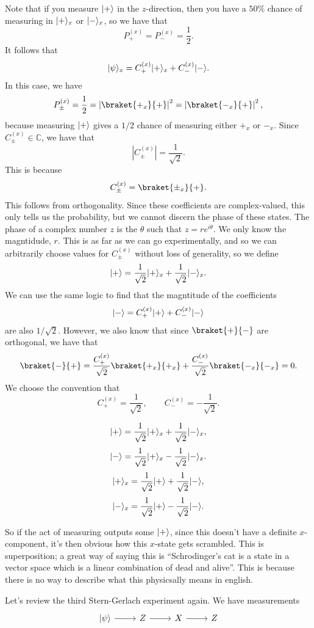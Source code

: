 Note that if you measure $\lvert+\rangle$ in the $z$-direction, then you have a $50\%$ chance of measuring in $\lvert+\rangle_x$ or $\lvert-\rangle_x$, so we have that
\[
	P_+^{(x)} =P_-^{(x)} =\frac{1}{2} 
.\]
It follows that
\[
	\lvert\psi\rangle_x = C_+^{(x)} \lvert+\rangle_x+C_-^{(x)} \lvert-\rangle
.\]
In this case, we have
\[
	P_{\pm}^{(x)} =\frac{1}{2} =\left| \braket{+_x}{+} \right| ^2 = \left| \braket{-_x}{+} \right|^2
,\]
because measuring $\lvert+\rangle$ gives a $1/2$ chance of measuring either $+_x$ or $-_x$. Since $C_\pm^{(x)} \in\mathbb{C} $, we have that
\[
	\left| C_\pm^{(x)}  \right| =\frac{1}{\sqrt{2} } 
.\]
This is because
\[
	C_{\pm} ^{(x)} =\braket{\pm_x}{+}
.\]
This follows from orthogonality. Since these coefficients are complex-valued, this only tells us the probability, but we cannot discern the phase of these states. The phase of a complex number $z$ is the $\theta $ such that $z=re^{i\theta } $. We only know the magntidude, $r$. This is as far as we can go experimentally, and so we can arbitrarily choose values for $C^{(x)} _{\pm} $ without loss of generality, so we define
\[
	\lvert+\rangle= \frac{1}{\sqrt{2} } \lvert+\rangle_x + \frac{1}{\sqrt{2} } \lvert-\rangle_x 
.\]
We can use the same logic to find that the magntitude of the coefficients
\[
	\lvert-\rangle = C_+^{(x)} \lvert+\rangle+C_-^{(x)} \lvert-\rangle
\]
are also $1/\sqrt{2} $. However, we also know that since $\braket{+}{-}$ are orthogonal, we have that
\[
	\braket{-}{+}=\frac{C_+^{(x)} }{\sqrt{2} } \braket{+_x}{+_x}+\frac{C_-^{(x)} }{\sqrt{2} } \braket{-_x}{-_x}=0
.\]
We choose the convention that
\[
	C^{(x)} _+ = \frac{1}{\sqrt{2} } ,\qquad C_-^{(x)} =-\frac{1}{\sqrt{2} } 
.\]
\begin{mdframed}
	\[
		\lvert+\rangle=\frac{1}{\sqrt{2} } \lvert+\rangle_x+\frac{1}{\sqrt{2} } \lvert-\rangle_x
	,\]
	\[
		\lvert-\rangle=\frac{1}{\sqrt{2} } \lvert+\rangle_x-\frac{1}{\sqrt{2} } \lvert-\rangle_x
	.\]
	\[
		\lvert+\rangle_x=\frac{1}{\sqrt{2} } \lvert+\rangle+\frac{1}{\sqrt{2} } \lvert-\rangle
	,\]
	\[
		\lvert-\rangle_x=\frac{1}{\sqrt{2} } \lvert+\rangle-\frac{1}{\sqrt{2} } \lvert-\rangle
	.\]
\end{mdframed}
So if the act of measuring outputs some $\lvert+\rangle$, since this doesn't have a definite $x$-component, it's then obvious how this $x$-state gets scrambled. This is superposition; a great way of saying this is ``Schrodinger's cat is a state in a vector space which is a linear combination of dead and alive''. This is because there is no way to describe what this physicsally means in english.

Let's review the third Stern-Gerlach experiment again. We have measurements
\[\begin{tikzcd}[row sep = 2.5em, column sep = 2.5em]
	\ket{\psi }\arrow[r]&Z\arrow[r]&X\arrow[r]&Z
\end{tikzcd}\]

